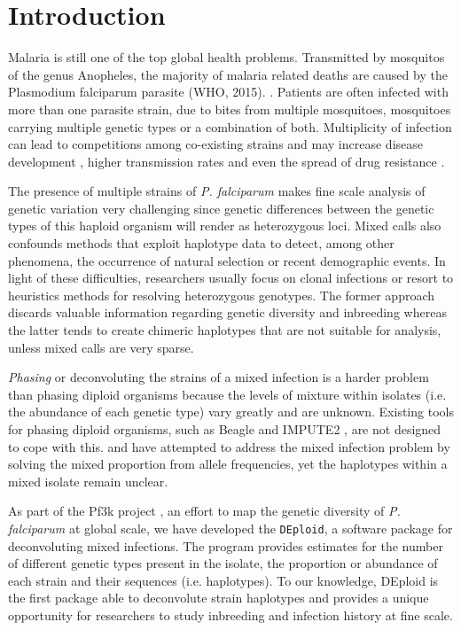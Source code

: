 \documentclass{bioinfo}
\begin{document}
\section{Introduction}
Malaria is still one of the top global health problems. Transmitted by mosquitos of the genus Anopheles, the majority of malaria related deaths are caused by the  Plasmodium falciparum parasite (WHO, 2015). . Patients are often infected with  more than one parasite strain, due to bites from multiple mosquitoes, mosquitoes carrying multiple genetic types or a combination of both. Multiplicity of infection  can lead to competitions among co-existing strains  and may increase  disease development \citep{deRoode2005}, higher transmission rates \citep{Arnot1998} and even the spread of drug resistance \citep{deRoode2004}.

The presence of multiple strains of {\it P. falciparum} makes fine scale analysis of genetic variation very challenging since genetic differences between the genetic types of this haploid organism will render as heterozygous loci. Mixed calls also confounds methods that exploit haplotype data to detect, among other phenomena, the occurrence of natural selection or recent demographic events. In light of these difficulties, researchers usually focus on clonal infections or resort to heuristics methods for resolving heterozygous genotypes. The former approach discards valuable information regarding genetic diversity and inbreeding whereas the latter tends to create chimeric haplotypes that are not suitable for analysis, unless mixed calls are very sparse.

{\it Phasing} or deconvoluting the strains of a mixed infection is a harder problem than phasing diploid organisms because the levels of mixture within isolates (i.e. the abundance of each genetic type) vary greatly and are unknown.  Existing tools for phasing diploid organisms, such as Beagle \citep{Browning2007} and IMPUTE2 \citep{Howie2009}, are not designed to cope with this. \citet{Galinsky2015} and \citet{Jack2016} have attempted to address the mixed infection problem by solving the mixed proportion from allele frequencies, yet the haplotypes within a mixed isolate remain unclear.


As part of the Pf3k project \citep{Pf3k2016}, an effort to map the genetic diversity of {\it P. falciparum} at global scale, we have developed the {\tt DEploid}, a software package for deconvoluting  mixed infections. The program provides estimates for the number of different genetic types present in the isolate, the proportion or abundance of each strain and their sequences (i.e. haplotypes). To our knowledge, DEploid is the first package able to deconvolute strain haplotypes and provides a unique opportunity for researchers to study inbreeding and infection history at fine scale.
\end{document}

